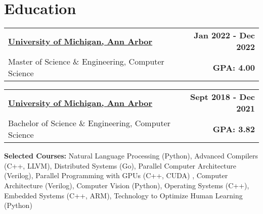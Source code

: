 \documentclass[10pt]{extreport}
\makeatletter
\newcommand{\resumeSubheading}[4]{
  \vspace{-1pt}
    \begin{tabular*}{1.0\textwidth}{l@{\extracolsep{\fill}}r}
      \textbf{#1} & \textbf{#2}  \vspace{1mm} \\
      {#3} & \textbf{#4} \\
    \end{tabular*}\vspace{-3pt}
}
\makeatother
\begin{document}
\vspace{-1.5mm}

\section{Education}
        \resumeSubheading{\underline{University of Michigan, Ann Arbor}} {Jan 2022 - Dec 2022}
      {Master of Science \& Engineering, Computer Science}{ GPA: 4.00}
     
      \vspace{2mm}
    \resumeSubheading{\underline{University of Michigan, Ann Arbor}}{Sept 2018 - Dec 2021}
      {Bachelor of Science \& Engineering, Computer Science}{GPA: 3.82}
            \vspace{2mm}

      {\textbf{Selected Courses:} Natural Language Processing (Python), Advanced Compilers (C++, LLVM), Distributed Systems (Go), Parallel Computer Architecture (Verilog), Parallel Programming with GPUs (C++, CUDA) , Computer Architecture (Verilog), Computer Vision (Python), Operating Systems (C++), Embedded Systems (C++, ARM), Technology to Optimize Human Learning (Python) }{}

\vspace{-1.5mm}
\vspace{-5pt}
\end{document}
